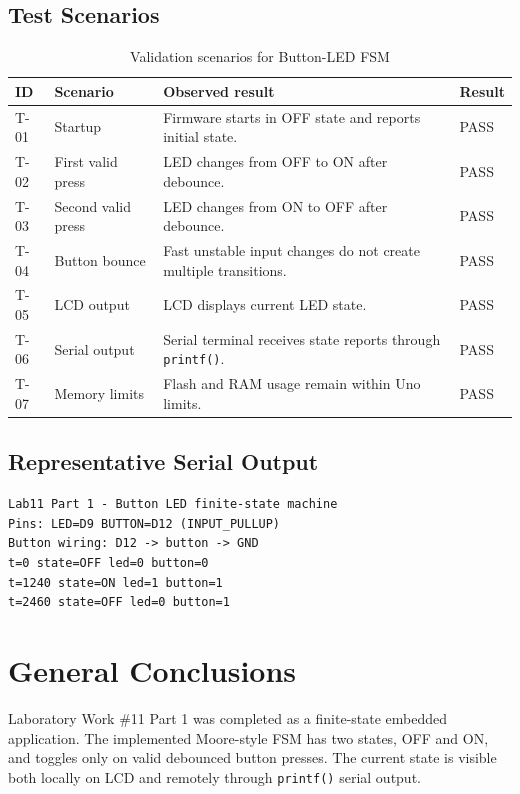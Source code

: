 \documentclass[12pt]{article}
\begin{document}
\subsection{Test Scenarios}
\begin{table}[H]
\centering
\small
\begin{tabular}{p{0.8cm} p{3.1cm} p{6.1cm} p{1.3cm}}
\toprule
\textbf{ID} & \textbf{Scenario} & \textbf{Observed result} & \textbf{Result} \\
\midrule
T-01 & Startup & Firmware starts in OFF state and reports initial state. & PASS \\
T-02 & First valid press & LED changes from OFF to ON after debounce. & PASS \\
T-03 & Second valid press & LED changes from ON to OFF after debounce. & PASS \\
T-04 & Button bounce & Fast unstable input changes do not create multiple transitions. & PASS \\
T-05 & LCD output & LCD displays current LED state. & PASS \\
T-06 & Serial output & Serial terminal receives state reports through \texttt{printf()}. & PASS \\
T-07 & Memory limits & Flash and RAM usage remain within Uno limits. & PASS \\
\bottomrule
\end{tabular}
\caption{Validation scenarios for Button-LED FSM}
\label{tab:tests}
\end{table}

\subsection{Representative Serial Output}
\begin{verbatim}
Lab11 Part 1 - Button LED finite-state machine
Pins: LED=D9 BUTTON=D12 (INPUT_PULLUP)
Button wiring: D12 -> button -> GND
t=0 state=OFF led=0 button=0
t=1240 state=ON led=1 button=1
t=2460 state=OFF led=0 button=1
\end{verbatim}

\section*{General Conclusions}
\hspace{0.8cm} Laboratory Work \#11 Part 1 was completed as a finite-state embedded application. The implemented Moore-style FSM has two states, OFF and ON, and toggles only on valid debounced button presses. The current state is visible both locally on LCD and remotely through \texttt{printf()} serial output.
\end{document}
